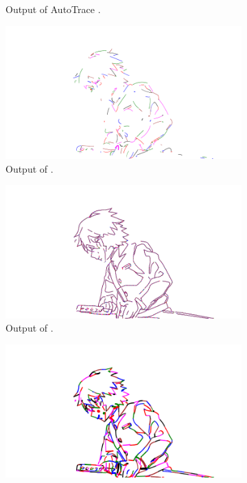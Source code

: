 \begin{figure}[h]
\begin{subfigure}{.49\textwidth}
    \caption{Output of AutoTrace \citep{autotrace}.}
    \end{subfigure}
    \begin{subfigure}{.49\textwidth}
    \includegraphics[width=\textwidth]{graphics/outputs/deepvectechdraw/order/tonari-full_42.pdf}
    \caption{Output of \citet{DBLP:conf/eccv/EgiazarianVAVST20}.}
    \end{subfigure}
    \begin{subfigure}{.49\textwidth}
    \includegraphics[width=\textwidth]{graphics/outputs/polyvector-flow/order/tonari-full_42.pdf}
    \caption{Output of \citet{Puhachov2021KeypointPolyvector}.}
    \label{fig:tonari-full_42_full.order.polyector}
    \end{subfigure}
    \begin{subfigure}{.49\textwidth}
    \includegraphics[width=\textwidth]{graphics/outputs/virtual-sketching/order/tonari-full_42.pdf}

\end{subfigure}
\end{figure}
